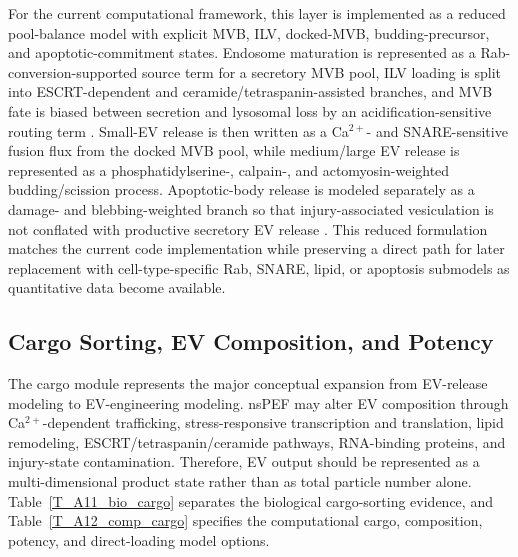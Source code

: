 For the current computational framework, this layer is implemented as a reduced pool-balance model with explicit MVB, ILV, docked-MVB, budding-precursor, and apoptotic-commitment states. Endosome maturation is represented as a Rab-conversion-supported source term for a secretory MVB pool, ILV loading is split into ESCRT-dependent and ceramide/tetraspanin-assisted branches, and MVB fate is biased between secretion and lysosomal loss by an acidification-sensitive routing term \cite{ott2025coordination,choezom2022nsmase2,villarroyaBeltri2016isgylation}. Small-EV release is then written as a Ca$^{2+}$- and SNARE-sensitive fusion flux from the docked MVB pool, while medium/large EV release is represented as a phosphatidylserine-, calpain-, and actomyosin-weighted budding/scission process. Apoptotic-body release is modeled separately as a damage- and blebbing-weighted branch so that injury-associated vesiculation is not conflated with productive secretory EV release \cite{liu2023snare,messenger2018munc13,pang2025arf,teixeira2020rock1}. This reduced formulation matches the current code implementation while preserving a direct path for later replacement with cell-type-specific Rab, SNARE, lipid, or apoptosis submodels as quantitative data become available.



\subsection*{Cargo Sorting, EV Composition, and Potency}

The cargo module represents the major conceptual expansion from EV-release modeling to EV-engineering modeling. nsPEF may alter EV composition through Ca$^{2+}$-dependent trafficking, stress-responsive transcription and translation, lipid remodeling, ESCRT/tetraspanin/ceramide pathways, RNA-binding proteins, and injury-state contamination. Therefore, EV output should be represented as a multi-dimensional product state rather than as total particle number alone. Table~\ref{T_A11_bio_cargo} separates the biological cargo-sorting evidence, and Table~\ref{T_A12_comp_cargo} specifies the computational cargo, composition, potency, and direct-loading model options.

